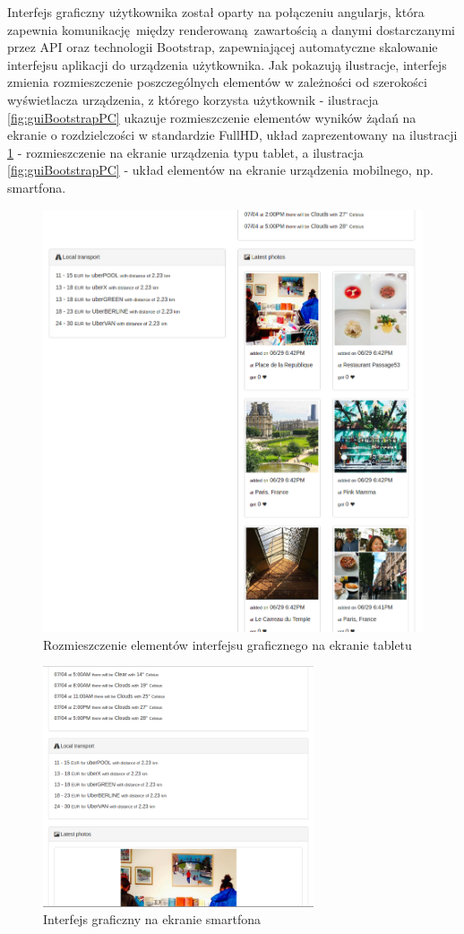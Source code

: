 \documentclass[oneside]{mgr}
\begin{document}
Interfejs graficzny użytkownika został oparty na połączeniu angularjs, która zapewnia komunikację między renderowaną zawartością a danymi dostarczanymi przez API oraz technologii Bootstrap, zapewniającej automatyczne skalowanie interfejsu aplikacji do urządzenia użytkownika. Jak pokazują ilustracje, interfejs zmienia rozmieszczenie poszczególnych elementów w zależności od szerokości wyświetlacza urządzenia, z którego korzysta użytkownik - ilustracja \ref{fig:guiBootstrapPC} ukazuje rozmieszczenie elementów wyników żądań na ekranie o rozdzielczości w standardzie FullHD, układ zaprezentowany na ilustracji \ref{fig:guiBootstrapTablet} - rozmieszczenie na ekranie urządzenia typu tablet, a ilustracja \ref{fig:guiBootstrapPC} - układ elementów na ekranie urządzenia mobilnego, np. smartfona.

\begin{figure}
	\centering
	\includegraphics[width=11.5cm]{2017-06-2918:42:27}
	\caption{Rozmieszczenie elementów interfejsu graficznego na ekranie tabletu}
	\label{fig:guiBootstrapTablet}
\end{figure}

\begin{figure}
	\centering
	\includegraphics[width=8cm]{2017-06-2918:52:04}
	\caption{Interfejs graficzny na ekranie smartfona}
	\label{fig:guiBootstrapSmartphone}
\end{figure}
\end{document}
